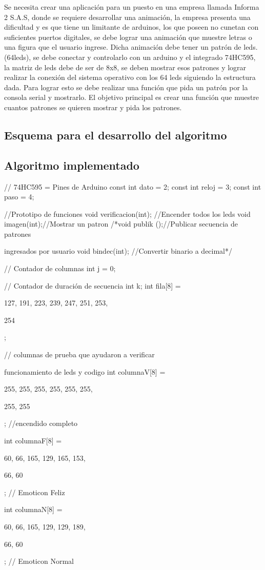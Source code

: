 \documentclass{article}
\begin{document}
Se necesita crear una aplicación para un puesto en una empresa llamada Informa 2 S.A.S, donde se requiere desarrollar una animación, la empresa presenta una dificultad y es que tiene un limitante de arduinos, los que poseen no cunetan con suficientes puertos digitales, se debe lograr una animación que muestre letras o una figura que el usuario ingrese. Dicha animación debe tener un patrón de leds. (64leds), se debe conectar y controlarlo con un arduino y el integrado 74HC595, la matriz de leds debe de ser de 8x8, se deben mostrar esos patrones y lograr realizar la conexión del sistema operativo con los 64 leds siguiendo la estructura dada. Para lograr esto se debe realizar una función que pida un patrón por la consola serial y mostrarlo. El objetivo principal es crear una función que muestre cuantos patrones se quieren mostrar y pida los patrones.



\subsection{Esquema para el desarrollo del algoritmo}


\subsection{Algoritmo implementado}
// 74HC595 = Pines de Arduino
const int dato = 2;
const int reloj = 3;
const int paso = 4;

//Prototipo de funciones
void verificacion(int); //Encender todos los leds
void imagen(int);//Mostrar un patron
/*void publik ();//Publicar secuencia de patrones 

ingresados por usuario
void bindec(int); //Convertir binario a decimal*/
            

// Contador de columnas
int j = 0;

// Contador de duración de secuencia
int k;
int fila[8] = {127, 191, 223, 239, 247, 251, 253, 

254};


// columnas de prueba que ayudaron a verificar 

funcionamiento de leds y codigo
int columnaV[8] = {255, 255, 255, 255, 255, 255, 

255, 255}; //encendido completo

int columnaF[8] = {60, 66, 165, 129, 165, 153, 

66, 60}; // Emoticon Feliz

int columnaN[8] = {60, 66, 165, 129, 129, 189, 

66, 60}; // Emoticon Normal
\end{document}

